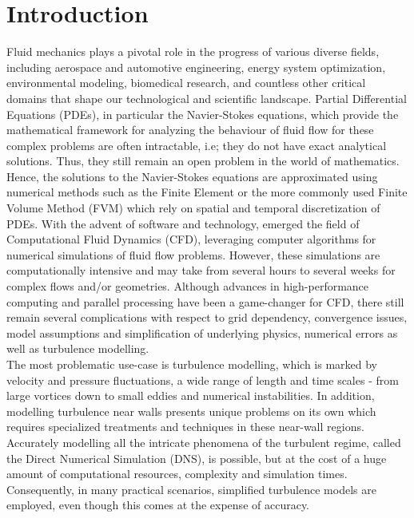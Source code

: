 \chapter{Introduction}
\label{chap:Intro}
Fluid mechanics plays a pivotal role in the progress of various diverse fields, including aerospace and automotive engineering, energy system optimization, environmental modeling, biomedical research, and countless other critical domains that shape our technological and scientific landscape. Partial Differential Equations (PDEs), in particular the Navier-Stokes equations, which provide the mathematical framework for analyzing the behaviour of fluid flow for these complex problems are often intractable, i.e; they do not have exact analytical solutions. Thus, they still remain an open problem in the world of mathematics. Hence, the solutions to the Navier-Stokes equations are approximated using numerical methods such as the Finite Element or the more commonly used Finite Volume Method (FVM) which rely on spatial and temporal discretization of PDEs. With the advent of software and technology, emerged the field of Computational Fluid Dynamics (CFD), leveraging computer algorithms for numerical simulations of fluid flow problems. However, these simulations are computationally intensive and may take from several hours to several weeks for complex flows and/or geometries. Although advances in high-performance computing and parallel processing have been a game-changer for CFD, there still remain several complications with respect to grid dependency, convergence issues, model assumptions and simplification of underlying physics, numerical errors as well as turbulence modelling. \\
The most problematic use-case is turbulence modelling, which is marked by velocity and pressure fluctuations, a wide range of length and time scales - from large vortices down to small eddies and numerical instabilities. In addition, modelling turbulence near walls presents unique problems on its own which requires specialized treatments and techniques in these near-wall regions. Accurately modelling all the intricate phenomena of the turbulent regime, called the Direct Numerical Simulation (DNS), is possible, but at the cost of a huge amount of computational resources, complexity and simulation times. Consequently, in many practical scenarios, simplified turbulence models are employed, even though this comes at the expense of accuracy. \\
